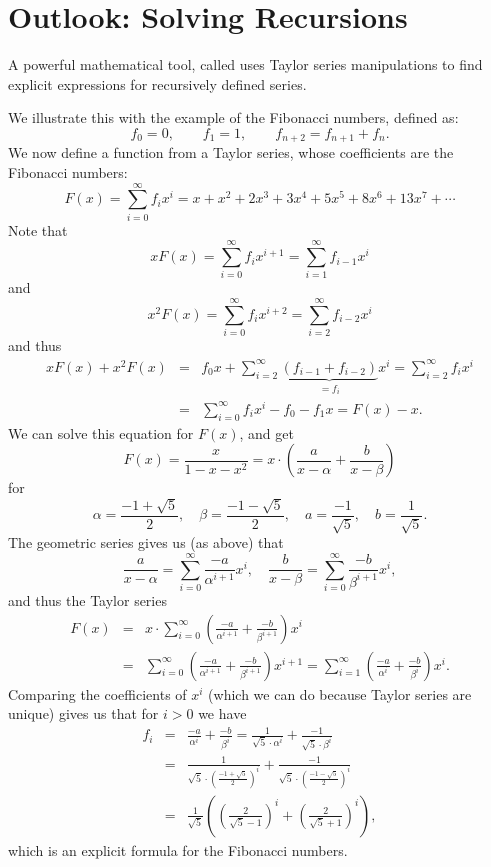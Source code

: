 
\section{Outlook: Solving Recursions}
\label{solvfibo}

A powerful mathematical tool, called  uses
Taylor series manipulations to find explicit expressions for recursively
defined series.

We illustrate this with the example of the Fibonacci
numbers, defined as:
\[
f_0=0,\qquad f_1=1,\qquad f_{n+2}=f_{n+1}+f_n.
\]
We now define a function from a Taylor series, whose coefficients are the
Fibonacci numbers:
\[
F(x)=\sum_{i=0}^\infty f_i x^i=x+x^2+2x^3+3x^4+5x^5+8x^6+13x^7+\cdots
\]
Note that
\[
xF(x)=\sum_{i=0}^\infty f_i x^{i+1}=\sum_{i=1}^\infty f_{i-1} x^i
\]
and
\[
x^2F(x)=\sum_{i=0}^\infty f_i x^{i+2}=\sum_{i=2}^\infty f_{i-2} x^i
\]
and thus
\begin{eqnarray*}
xF(x)+x^2F(x)&=&f_0x+\sum_{i=2}^\infty \underbrace{(f_{i-1}+f_{i-2})}_{=f_i} x^i
=\sum_{i=2}^\infty f_i x^i\\
&=&\sum_{i=0}^\infty f_i x^i-f_0-f_1x=F(x)-x.
\end{eqnarray*}
We can solve this equation for $F(x)$, and get
\[
F(x)=\frac{x}{1-x-x^2}=x\cdot\left(\frac{a}{x-\alpha}+\frac{b}{x-\beta}\right)
\]
for
\[
\alpha=\frac{-1+\sqrt{5}}{2},\quad\beta=\frac{-1-\sqrt{5}}{2},\quad
a=\frac{-1}{\sqrt{5}},\quad b=\frac{1}{\sqrt{5}}.
\]
The geometric series gives us (as above) that
\[
\frac{a}{x-\alpha}=\sum_{i=0}^\infty \frac{-a}{\alpha^{i+1}}x^i,\quad
\frac{b}{x-\beta}=\sum_{i=0}^\infty \frac{-b}{\beta^{i+1}}x^i,
\]
and thus the Taylor series
\begin{eqnarray*}
F(x)&=& x\cdot
\sum_{i=0}^\infty\left(\frac{-a}{\alpha^{i+1}}+\frac{-b}{\beta^{i+1}}\right)x^i\\
&=&
\sum_{i=0}^\infty\left(\frac{-a}{\alpha^{i+1}}+\frac{-b}{\beta^{i+1}}\right)x^{i+1}
=\sum_{i=1}^\infty\left(\frac{-a}{\alpha^{i}}+\frac{-b}{\beta^{i}}\right)x^{i}.
\end{eqnarray*}
Comparing the coefficients of $x^i$ (which we can do because Taylor series
are unique) gives us that for $i>0$ we have
\begin{eqnarray*}
f_i&=&\frac{-a}{\alpha^{i}}+\frac{-b}{\beta^{i}}
=
\frac{1}{\sqrt{5}\cdot \alpha^i}+\frac{-1}{\sqrt{5}\cdot \beta^i}\\
&=&
\frac{1}{\sqrt{5}\cdot \left(\frac{-1+\sqrt{5}}{2}\right)^i}
+\frac{-1}{\sqrt{5}\cdot \left(\frac{-1-\sqrt{5}}{2}\right)^i}\\
&=&\frac{1}{\sqrt{5}}\left(\left(\frac{2}{\sqrt{5}-1}\right)^i+\left(\frac{2}{\sqrt{5}+1}\right)^i\right),
\end{eqnarray*}
which is an explicit formula for the Fibonacci numbers.
